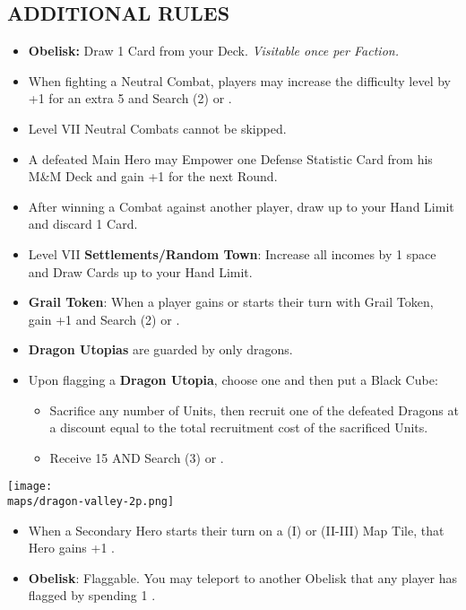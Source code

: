 \begin{multicols*}{2}
\subsection*{\MakeUppercase{Additional Rules}}
\begin{itemize}
  \item \textbf{Obelisk:} Draw 1 Card from your Deck. \textit{Visitable once per Faction.}
  \item When fighting a Neutral Combat, players may increase the difficulty level by +1 for an extra 5  and Search (2)  or . %
  \item Level VII Neutral Combats cannot be skipped.
  \item A defeated Main Hero may Empower one Defense Statistic Card from his M\&M Deck and gain +1  for the next Round.
  \item After winning a Combat against another player, draw up to your Hand Limit and discard 1 Card.
  \item Level VII \textbf{Settlements/Random Town}: Increase all incomes by 1 space and Draw Cards up to your Hand Limit.
  \item \textbf{Grail Token}: When a player gains or starts their turn with Grail Token, gain +1  and Search (2)  or .
  \item \textbf{Dragon Utopias} are guarded by only dragons.
  \item Upon flagging a \textbf{Dragon Utopia}, choose one and then put a Black Cube:
  \begin{itemize}
    \item Sacrifice any number of Units, then recruit one of the defeated Dragons at a discount equal to the total recruitment cost of the sacrificed Units.
    \item Receive 15  AND Search (3)  or .
  \end{itemize}
\end{itemize}

\begin{center}
  \vspace*{\fill}
  \texttt{[image: \\maps/dragon-valley-2p.png]}
\end{center}

\begin{itemize}
  \item When a Secondary Hero starts their turn on a (I) or (II-III) Map Tile, that Hero gains +1 .
  \item \textbf{Obelisk}: Flaggable. You may teleport to another Obelisk that any player has flagged by spending 1 .
\end{itemize}


\end{multicols*}
